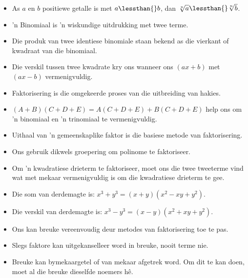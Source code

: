 \begin{itemize}[itemsep=5pt, label=\textbullet{}]
\item As $a$ en $b$ positiewe getalle is met $a\lessthan{}b$, dan $\sqrt[n]{a}\lessthan{}\sqrt[n]{b}$.
\item ’n Binomiaal is ’n wiskundige uitdrukking met twee terme.
\item Die produk van twee identiese binomiale staan bekend as die vierkant of kwadraat van die binomiaal. 
\item Die verskil tussen twee kwadrate kry ons wanneer ons $(ax+b)$ met $(ax-b)$ vermenigvuldig.
\item Faktorisering is die omgekeerde proses van die uitbreiding van hakies.
\item $(A+B)(C+D+E)=A(C+D+E)+B(C+D+E)$ help ons om ’n binomiaal en ’n trinomiaal te vermenigvuldig.
\item Uithaal van 'n gemeenskaplike faktor is die basiese metode van faktorisering.
\item Ons gebruik dikwels groepering om polinome te faktoriseer.
\item Om ’n kwadratiese drieterm te faktoriseer, moet ons die twee tweeterme vind wat met mekaar vermenigvuldig is om die kwadratiese drieterm te gee.
\item Die som van derdemagte is: ${x}^{3}+{y}^{3}=(x+y)({x}^{2}-xy+{y}^{2})$. 
\item Die verskil van derdemagte is: ${x}^{3}-{y}^{3}=(x-y)({x}^{2}+xy+{y}^{2})$.
\item Ons kan breuke vereenvoudig deur metodes van faktorisering toe te pas.
\item Slegs faktore kan uitgekanselleer word in breuke, nooit terme nie.
\item Breuke kan bymekaargetel of van mekaar afgetrek word. Om dit te kan doen, moet al die breuke dieselfde
noemers hê.

\end{itemize}


